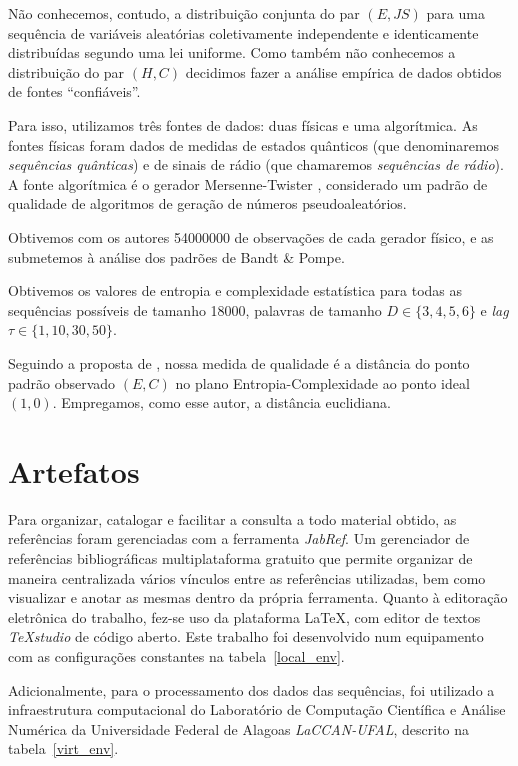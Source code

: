 Não conhecemos, contudo, a distribuição conjunta do par $(E,JS)$ para uma sequência de variáveis aleatórias coletivamente independente e identicamente distribuídas segundo uma lei uniforme.
Como também não conhecemos a distribuição do par $(H,C)$ decidimos fazer a análise empírica de dados obtidos de fontes ``confiáveis''.

Para isso, utilizamos três fontes de dados: duas físicas e uma algorítmica.
As fontes físicas foram dados de medidas de estados quânticos \citep{RNGVacuumStates} (que denominaremos \textit{sequências quânticas}) e de sinais de rádio \citep{RandomHostingAdvice} (que chamaremos \textit{sequências de rádio}).
A fonte algorítmica é o gerador Mersenne-Twister \citep{Matsumoto98}, considerado um padrão de qualidade de algoritmos de geração de números pseudoaleatórios.

Obtivemos com os autores \num{54000000} de observações de cada gerador físico, e as submetemos à análise dos padrões de Bandt \& Pompe.

Obtivemos os valores de entropia e complexidade estatística para todas as sequências possíveis de tamanho \num{18000}, palavras de tamanho $D\in\{3, 4, 5, 6\}$ e \textit{lag} $\tau\in\{1, 10, 30,50\}$.

Seguindo a proposta de \citet{NewPermutationEntropy}, nossa medida de qualidade é a distância do ponto padrão observado $(E,C)$ no plano Entropia-Complexidade ao ponto ideal $(1,0)$.
Empregamos, como esse autor, a distância euclidiana.


\section{Artefatos}Para organizar, catalogar e facilitar a consulta a todo material obtido, as referências foram gerenciadas com a ferramenta \emph{JabRef}. Um gerenciador de referências bibliográficas multiplataforma gratuito que permite organizar de maneira centralizada vários vínculos entre as referências utilizadas, bem como visualizar e anotar as mesmas dentro da própria ferramenta. Quanto à editoração eletrônica do trabalho, fez-se uso da plataforma \LaTeX, com editor de textos \emph{TeXstudio} de código aberto. Este trabalho foi desenvolvido num equipamento com as configurações constantes na tabela~\ref{local_env}.

Adicionalmente, para o processamento dos dados das sequências, foi utilizado a infraestrutura computacional do Laboratório de Computação Científica e Análise Numérica da Universidade Federal de Alagoas \textit{LaCCAN-UFAL}, descrito na tabela~\ref{virt_env}.

